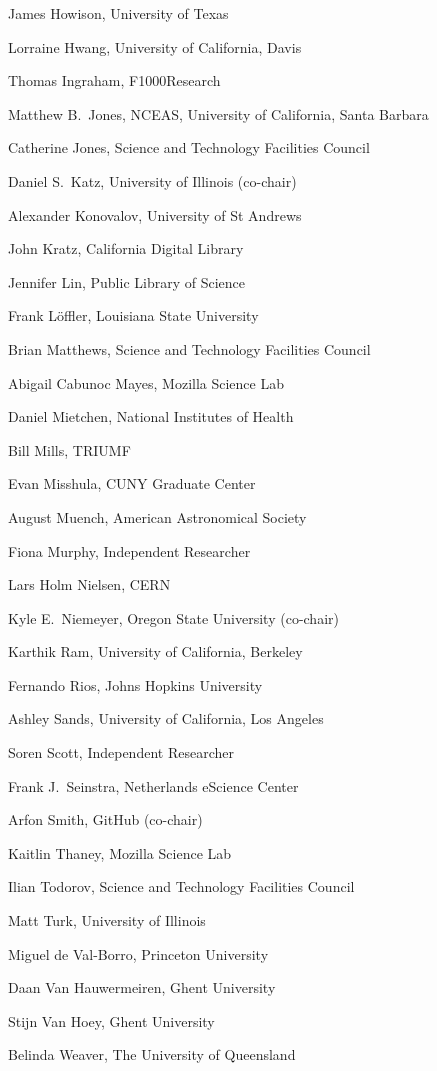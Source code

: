 \documentclass[12pt, oneside]{amsart}
\begin{document}
James Howison, University of Texas

Lorraine Hwang, University of California,  Davis

Thomas Ingraham, F1000Research

Matthew B.~Jones, NCEAS, University of California,  Santa Barbara

Catherine Jones, Science and Technology Facilities Council

Daniel S.~Katz, University of Illinois (co-chair)

Alexander Konovalov, University of St Andrews

John Kratz, California Digital Library

Jennifer Lin, Public Library of Science

Frank L\"offler, Louisiana State University

Brian Matthews, Science and Technology Facilities Council

Abigail Cabunoc Mayes, Mozilla Science Lab

Daniel Mietchen, National Institutes of Health

Bill Mills, TRIUMF

Evan Misshula, CUNY Graduate Center

August Muench, American Astronomical Society

Fiona Murphy, Independent Researcher

Lars Holm Nielsen, CERN

Kyle E.~Niemeyer, Oregon State University (co-chair)

Karthik Ram, University of California, Berkeley

Fernando Rios, Johns Hopkins University

Ashley Sands, University of California, Los Angeles

Soren Scott, Independent Researcher

Frank J.~Seinstra, Netherlands eScience Center

Arfon Smith, GitHub (co-chair)

Kaitlin Thaney, Mozilla Science Lab

Ilian Todorov, Science and Technology Facilities Council

Matt Turk, University of Illinois

Miguel de Val-Borro, Princeton University

Daan Van Hauwermeiren, Ghent University

Stijn Van Hoey, Ghent University

Belinda Weaver, The University of Queensland
\end{document}
